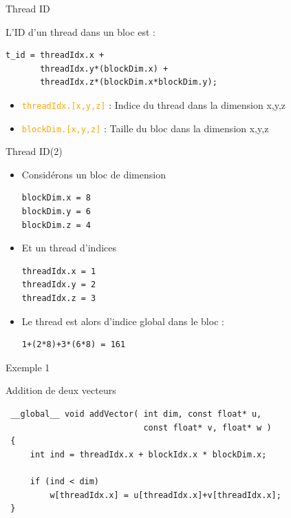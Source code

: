 \documentclass[handout,francais]{beamer}
\begin{document}
\begin{frame}[containsverbatim]{Thread ID}

L'ID d'un thread dans un bloc est :
\begin{lstlisting}
t_id = threadIdx.x + 
       threadIdx.y*(blockDim.x) + 
       threadIdx.z*(blockDim.x*blockDim.y);
\end{lstlisting}

\begin{itemize}
\item \textcolor{orange}{\texttt{threadIdx.[x,y,z]}} : Indice du thread dans la dimension x,y,z
\item \textcolor{orange}{\texttt{blockDim.[x,y,z]}}  : Taille du bloc dans la dimension x,y,z
\end{itemize}
\end{frame}

\begin{frame}[containsverbatim]{Thread ID(2)}
\begin{itemize}
\item Considérons un bloc de dimension
\begin{lstlisting}
blockDim.x = 8
blockDim.y = 6
blockDim.z = 4
\end{lstlisting}
\item Et un thread d'indices
\begin{lstlisting}
threadIdx.x = 1
threadIdx.y = 2
threadIdx.z = 3
\end{lstlisting}
\item Le thread est alors d'indice global dans le bloc :
\begin{lstlisting}
1+(2*8)+3*(6*8) = 161
\end{lstlisting}
\end{itemize}
\end{frame}

\begin{frame}[fragile]{Exemple 1}

\begin{block}{Addition de deux vecteurs}
 \begin{lstlisting}
 __global__ void addVector( int dim, const float* u, 
                            const float* v, float* w )
 {
     int ind = threadIdx.x + blockIdx.x * blockDim.x;
     
     if (ind < dim)
         w[threadIdx.x] = u[threadIdx.x]+v[threadIdx.x];
 }
 \end{lstlisting}
\end{block}

\end{frame}
\end{document}
